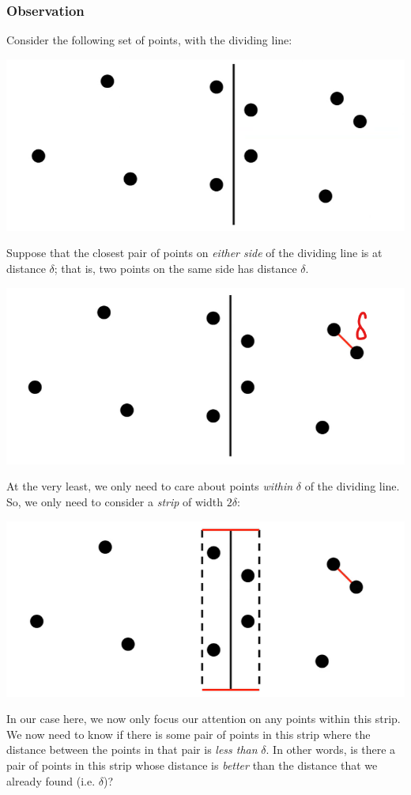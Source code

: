 \documentclass[letterpaper]{article}
\begin{document}
\subsubsection{Observation}
Consider the following set of points, with the dividing line: 
\begin{center}
    \includegraphics[scale=0.3]{assets/closest_pts_3.png}
\end{center}
Suppose that the closest pair of points on \emph{either side} of the dividing line is at distance $\delta$; that is, two points on the same side has distance $\delta$. 
\begin{center}
    \includegraphics[scale=0.3]{assets/closest_pts_4.png}
\end{center}
At the very least, we only need to care about points \emph{within} $\delta$ of the dividing line. So, we only need to consider a \emph{strip} of width $2\delta$:
\begin{center}
    \includegraphics[scale=0.3]{assets/closest_pts_5.png}
\end{center}
In our case here, we now only focus our attention on any points within this strip. We now need to know if there is some pair of points in this strip where the distance between the points in that pair is \emph{less than} $\delta$. In other words, is there a pair of points in this strip whose distance is \emph{better} than the distance that we already found (i.e. $\delta$)?
\end{document}

